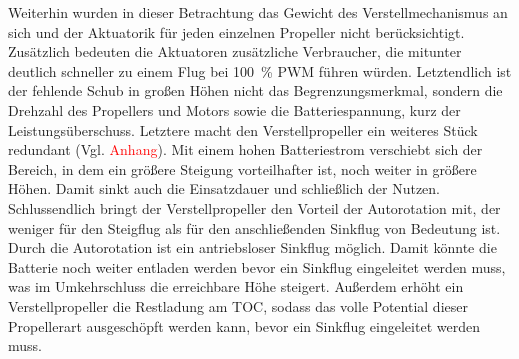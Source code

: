 Weiterhin wurden in dieser Betrachtung das Gewicht des Verstellmechanismus an sich und der Aktuatorik für jeden einzelnen Propeller nicht berücksichtigt. Zusätzlich bedeuten die Aktuatoren zusätzliche Verbraucher, die mitunter deutlich schneller zu einem Flug bei \SI{100}{\%} PWM führen würden. Letztendlich ist der fehlende Schub in großen Höhen nicht das Begrenzungsmerkmal, sondern die Drehzahl des Propellers und Motors sowie die Batteriespannung, kurz der Leistungsüberschuss. Letztere macht den Verstellpropeller ein weiteres Stück redundant (Vgl. \textcolor{red}{Anhang}). Mit einem hohen Batteriestrom verschiebt sich der Bereich, in dem ein größere Steigung vorteilhafter ist, noch weiter in größere Höhen. Damit sinkt auch die Einsatzdauer und schließlich der Nutzen. 
Schlussendlich bringt der Verstellpropeller den Vorteil der Autorotation mit, der weniger für den Steigflug als für den anschließenden Sinkflug von Bedeutung ist. Durch die Autorotation ist ein antriebsloser Sinkflug möglich. Damit könnte die Batterie noch weiter entladen werden bevor ein Sinkflug eingeleitet werden muss, was im Umkehrschluss die erreichbare Höhe steigert. Außerdem erhöht ein Verstellpropeller die Restladung am TOC, sodass das volle Potential dieser Propellerart ausgeschöpft werden kann, bevor ein Sinkflug eingeleitet werden muss. 

